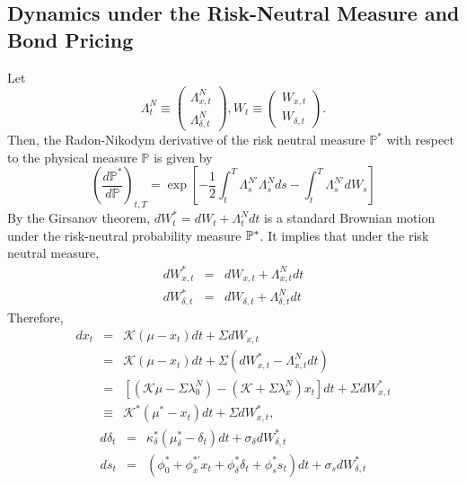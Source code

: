 \documentclass{article}
\begin{document}
\subsection{Dynamics under the Risk-Neutral Measure and Bond Pricing}

Let 
\begin{equation*}
\Lambda _{t}^{N}\equiv \left( 
\begin{array}{c}
\Lambda _{x,t}^{N} \\ 
\Lambda _{\delta ,t}^{N}%
\end{array}%
\right) ,W_{t}\equiv \left( 
\begin{array}{c}
W_{x,t} \\ 
W_{\delta ,t}%
\end{array}%
\right) .
\end{equation*}%
Then, the Radon-Nikodym derivative of the risk neutral measure $\mathbb{P}%
^{\ast }$ with respect to the physical measure $\mathbb{P}$ is given by%
\begin{equation}
\left( \frac{d\mathbb{P}^{\ast }}{d\mathbb{P}}\right) _{t,T}=\exp \left[ -%
\frac{1}{2}\int_{t}^{T}\Lambda _{s}^{N\prime }\Lambda
_{s}^{N}ds-\int_{t}^{T}\Lambda _{s}^{N\prime }dW_{s}\right] 
\end{equation}%
By the Girsanov theorem, $dW_{t}^{\ast }=dW_{t}+\Lambda _{t}^{N}dt$ is a
standard Brownian motion under the risk-neutral probability measure $\mathbb{%
P}^{\ast }$. It implies that under the risk neutral measure, 
\begin{eqnarray*}
dW_{x,t}^{\ast } &=&dW_{x,t}+\Lambda _{x,t}^{N}dt \\
dW_{\delta ,t}^{\ast } &=&dW_{\delta ,t}+\Lambda _{\delta ,t}^{N}dt
\end{eqnarray*}%
Therefore,%
\begin{eqnarray*}
dx_{t} &=&\mathcal{K}\left( \mu -x_{t}\right) dt+\Sigma dW_{x,t} \\
&=&\mathcal{K}\left( \mu -x_{t}\right) dt+\Sigma \left( dW_{x,t}^{\ast
}-\Lambda _{x,t}^{N}dt\right)  \\
&=&\left[ \left( \mathcal{K}\mu -\Sigma \lambda _{0}^{N}\right) -\left( 
\mathcal{K}+\Sigma \lambda _{x}^{N}\right) x_{t}\right] dt+\Sigma
dW_{x,t}^{\ast } \\
&\equiv &\mathcal{K}^{\ast }\left( \mu ^{\ast }-x_{t}\right) dt+\Sigma
dW_{x,t}^{\ast },
\end{eqnarray*}%
\begin{eqnarray*}
d\delta _{t} &=&\kappa _{\delta }^{\ast }\left( \mu _{\delta }^{\ast
}-\delta _{t}\right) dt+\sigma _{\delta }dW_{\delta ,t}^{\ast } \\
ds_{t} &=&\left( \phi _{0}^{\ast }+\phi _{x}^{\ast \prime }x_{t}+\phi
_{\delta }^{\ast }\delta _{t}+\phi _{s}^{\ast }s_{t}\right) dt+\sigma
_{s}dW_{\delta ,t}^{\ast }
\end{eqnarray*}%
\end{document}
